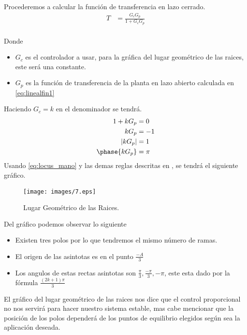 \documentclass[a4paper]{IEEEtran} %
\begin{document}
Procederemos a calcular la función de transferencia en lazo cerrado.
\begin{equation}
    \begin{split}
        T&=\frac{G_{c}G_{p}}{1+G_{c}G_{p}}\\
    \end{split}
    \label{eq:locus}
\end{equation}

Donde 
\begin{itemize}
    \item $G_{c}$ es el controlador a usar, para la gráfica del lugar geométrico de las raices, este será una constante.
    \item $G_{p}$ es la función de transferencia de la planta en lazo abierto calculada en \ref{eq:linealfin1}
\end{itemize}

Haciendo $G_{c}=k$ en el denominador se tendrá.
\begin{equation}
    \begin{split}
        1+kG_{p}&=0\\
        kG_{p}&=-1\\
        |kG_{p}|&=1\\
        \phase{kG_{p}}&=\pi\\
    \end{split}
    \label{eq:locus_mano}
\end{equation}
Usando \ref{eq:locus_mano} y las demas reglas descritas en  \cite{dorf2005sistemas}, se tendrá el siguiente gráfico.
\begin{figure}[h]
    \centering
        \texttt{[image: images/7.eps]}
        \caption{Lugar Geométrico de las Raices.}
        \label{fig:locus}
\end{figure}

Del gráfico podemos observar lo siguiente

\begin{itemize}
    \item Existen tres polos por lo que tendremos el mismo número de ramas.
    \item El origen de las asintotas es en el punto $\frac{-A}{3}$
    \item Los angulos de estas rectas asintotas son $\frac{\pi}{3},\frac{-\pi}{3},-\pi$, este esta dado por la fórmula $\frac{(2k+1)\pi}{3}$
\end{itemize}

El gráfico del lugar geométrico de las raices nos dice que el control proporcional no nos servirá para hacer nuestro sistema estable, mas cabe mencionar que la posición de los polos dependerá de los puntos de equilibrio elegidos según sea la aplicación deseada. 
\end{document}

